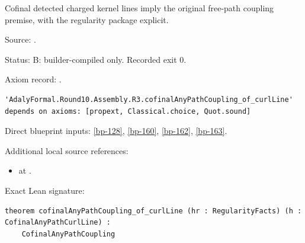 \begin{theorem}[bp-164]
\label{bp-164}
\leanok
Cofinal detected charged kernel lines imply the original free-path coupling premise, with the regularity package explicit.

\par Source: \texttt{}.
\par Status: B: builder-compiled only. Recorded exit 0.
\par Axiom record: \texttt{}.
\begin{verbatim}
'AdalyFormal.Round10.Assembly.R3.cofinalAnyPathCoupling_of_curlLine' depends on axioms: [propext, Classical.choice, Quot.sound]
\end{verbatim}
\par Direct blueprint inputs: \ref{bp-128}, \ref{bp-160}, \ref{bp-162}, \ref{bp-163}.
\par Additional local source references:
\begin{itemize}
\item \texttt{} at \texttt{}.
\end{itemize}
\par Exact Lean signature:
\begin{verbatim}
theorem cofinalAnyPathCoupling_of_curlLine (hr : RegularityFacts) (h : CofinalAnyPathCurlLine) :
    CofinalAnyPathCoupling
\end{verbatim}
\end{theorem}

